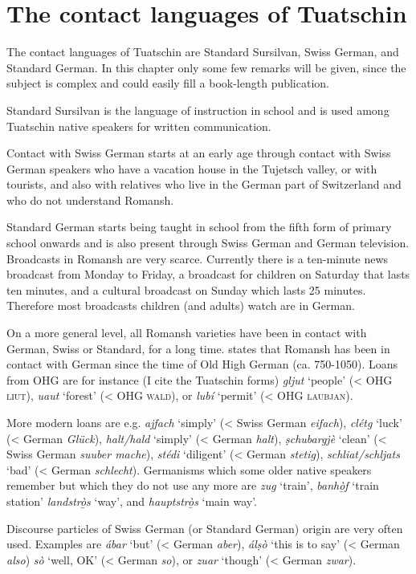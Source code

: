 \section{The contact languages of Tuatschin}
The contact languages of Tuatschin are Standard Sursilvan, Swiss German, and Standard German. In this chapter only some few remarks will be given, since the subject is complex and could easily fill a book-length publication. 

Standard Sursilvan is the language of instruction in school and is used among Tuatschin native speakers for written communication.

Contact with Swiss German starts at an early age through contact with Swiss German speakers who have a vacation house in the Tujetsch valley, or with tourists, and also with relatives who live in the German part of Switzerland and who do not understand Romansh.

Standard German starts being taught in school from the fifth form of primary school onwards and is also present through Swiss German and German television. Broadcasts in Romansh are very scarce. Currently there is a ten-minute news broadcast from Monday to Friday, a broadcast for children on Saturday that lasts ten minutes, and a cultural broadcast on Sunday which lasts 25 minutes. Therefore most broadcasts children (and adults) watch are in German.

On a more general level, all Romansh varieties have been in contact with German, Swiss or Standard, for a long time. \citet[176--181]{Liver2010} states that Romansh has been in contact with German since the time of Old High German (ca. 750-1050). Loans from OHG are for instance (I cite the Tuatschin forms) \textit{gljut} `people' (< OHG \textsc{liut}), \textit{uaut} `forest' (< OHG \textsc{wald}), or \textit{lubí} `permit' (< OHG \textsc{laubjan}).

More modern loans are e.g. \textit{ajfach} `simply' (< Swiss German \textit{eifach}), \textit{clétg} `luck' (< German \textit{Glück}), \textit{halt/hald} `simply' (< German \textit{halt}), \textit{ṣchubargjè} `clean' (< Swiss German \textit{suuber mache}), \textit{stédi} `diligent' (< German \textit{stetig}), \textit{schliat/schljats} `bad' (< German \textit{schlecht}). Germanisms which some older native speakers remember but which they do not use any more are \textit{zug} `train', \textit{banhò̱f} `train station' \textit{landstrò̱s} `way', and \textit{hauptstrò̱s} `main way'.

Discourse particles of Swiss German (or Standard German) origin are very often used. Examples are \textit{ábar} `but' (< German \textit{aber}), \textit{álṣò} `this is to say' (< German \textit{also}) \textit{sò} `well, OK' (< German \textit{so}), or \textit{zuar} `though' (< German \textit{zwar}).

